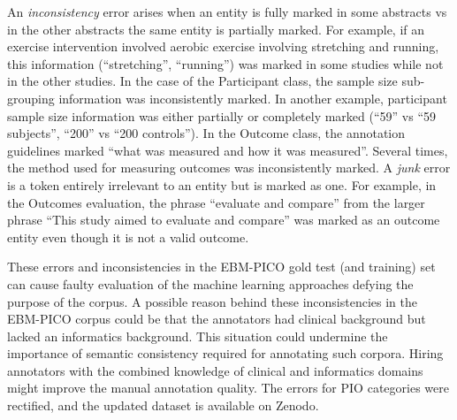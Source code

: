\documentclass[10.7pt,]{article}
\begin{document}
An \textit{inconsistency} error arises when an entity is fully marked in some abstracts vs in the other abstracts the same entity is partially marked. 
For example, if an exercise intervention involved aerobic exercise involving stretching and running, this information (``stretching'', ``running'') was marked in some studies while not in the other studies.
In the case of the Participant class, the sample size sub-grouping information was inconsistently marked.
In another example, participant sample size information was either partially or completely marked (``59'' vs ``59 subjects'', ``200'' vs ``200 controls'').
In the Outcome class, the annotation guidelines marked ``what was measured and how it was measured''. 
Several times, the method used for measuring outcomes was inconsistently marked.
A \textit{junk} error is a token entirely irrelevant to an entity but is marked as one.
For example, in the Outcomes evaluation, the phrase ``evaluate and compare'' from the larger phrase ``This study aimed to evaluate and compare'' was marked as an outcome entity even though it is not a valid outcome.


These errors and inconsistencies in the EBM-PICO gold test (and training) set can cause faulty evaluation of the machine learning approaches defying the purpose of the corpus.
A possible reason behind these inconsistencies in the EBM-PICO corpus could be that the annotators had clinical background but lacked an informatics background.
This situation could undermine the importance of semantic consistency required for annotating such corpora.
Hiring annotators with the combined knowledge of clinical and informatics domains might improve the manual annotation quality.
The errors for PIO categories were rectified, and the updated dataset is available on Zenodo.
%
%
%
\end{document}
